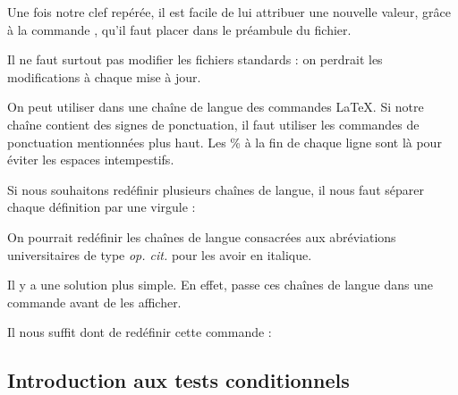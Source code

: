     Une fois  notre clef repérée, il est facile de lui attribuer une nouvelle valeur, grâce à la commande , qu'il faut placer dans le préambule du fichier.
    
    \begin{attention}
    Il ne faut surtout pas modifier les fichiers standards : on perdrait les modifications à chaque mise à jour.
    \end{attention}
    
    \begin{latexcode}
    \end{latexcode}

    
    On peut utiliser dans une chaîne de langue des commandes \LaTeX. Si notre chaîne contient des signes de ponctuation, il faut utiliser les commandes de ponctuation mentionnées plus haut. Les \% à la fin de chaque ligne sont là pour éviter les espaces intempestifs.
    
    Si nous souhaitons redéfinir plusieurs chaînes de langue, il nous faut séparer chaque définition par une virgule :
    
    \begin{latexcode}
    \end{latexcode}


\begin{plusloins}
On pourrait redéfinir les chaînes de langue consacrées aux abréviations universitaires de type \emph{op. cit.} pour les avoir en italique. 

Il y a une solution plus simple\label{mkibid}. En effet,  passe ces chaînes de langue dans une commande  avant de les afficher.

Il nous suffit dont de redéfinir cette commande :

\begin{latexcode}
\renewcommand{\mkibid}[1]{\emph{#1}}
\end{latexcode}

\end{plusloins}

\subsection{Introduction aux tests conditionnels}\label{opcit}

